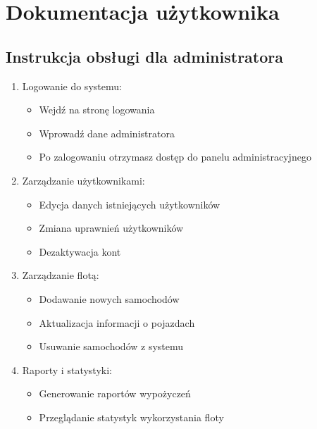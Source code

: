 \documentclass[12pt]{article}
\begin{document}
\section{Dokumentacja użytkownika}

\subsection{Instrukcja obsługi dla administratora}
\begin{enumerate}
    \item Logowanie do systemu:
    \begin{itemize}
        \item Wejdź na stronę logowania
        \item Wprowadź dane administratora
        \item Po zalogowaniu otrzymasz dostęp do panelu administracyjnego
    \end{itemize}

    \item Zarządzanie użytkownikami:
    \begin{itemize}
        \item Edycja danych istniejących użytkowników
        \item Zmiana uprawnień użytkowników
        \item Dezaktywacja kont
    \end{itemize}

    \item Zarządzanie flotą:
    \begin{itemize}
        \item Dodawanie nowych samochodów
        \item Aktualizacja informacji o pojazdach
        \item Usuwanie samochodów z systemu
    \end{itemize}

    \item Raporty i statystyki:
    \begin{itemize}
        \item Generowanie raportów wypożyczeń
        \item Przeglądanie statystyk wykorzystania floty
    \end{itemize}
\end{enumerate}
\end{document}
